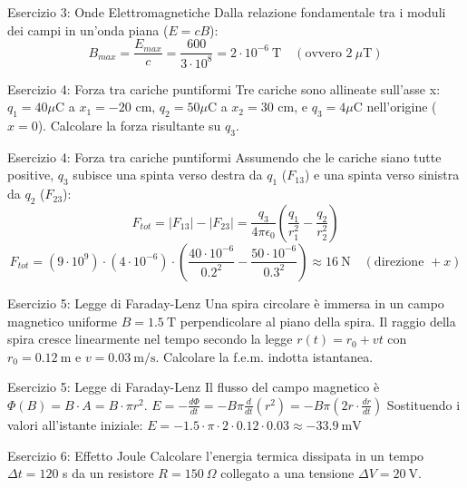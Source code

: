 \documentclass[a4paper]{article}
\begin{document}
\begin{snippetsolution}{Esercizio 3: Onde Elettromagnetiche}
    Dalla relazione fondamentale tra i moduli dei campi in un'onda piana (\(E=cB\)):
    \[
    B_{max} = \frac{E_{max}}{c} = \frac{600}{3\cdot10^{8}} = 2\cdot10^{-6}~\mathrm{T} \quad (\text{ovvero } 2~\mu \mathrm{T})
    \]
\end{snippetsolution}
\begin{snippetexercise}{Esercizio 4: Forza tra cariche puntiformi}
    Tre cariche sono allineate sull'asse x: \(q_{1}=40\mu \mathrm{C}\) a \(x_{1}=-20\) cm, \(q_{2}=50\mu \mathrm{C}\) a \(x_{2}=30\) cm, e \(q_{3}=4\mu \mathrm{C}\) nell'origine (\(x=0\)). Calcolare la forza risultante su \(q_{3}\).
\end{snippetexercise}
\begin{snippetsolution}{Esercizio 4: Forza tra cariche puntiformi}
    Assumendo che le cariche siano tutte positive, \(q_{3}\) subisce una spinta verso destra da \(q_{1}\) (\(F_{13}\)) e una spinta verso sinistra da \(q_{2}\) (\(F_{23}\)):
    \[
    F_{tot} = |F_{13}| - |F_{23}| = \frac{q_{3}}{4\pi\epsilon_{0}}\left(\frac{q_{1}}{r_{1}^{2}} - \frac{q_{2}}{r_{2}^{2}}\right)
    \]
    \[
    F_{tot} = (9\cdot10^{9})\cdot(4\cdot10^{-6})\cdot\left(\frac{40\cdot10^{-6}}{0.2^{2}} - \frac{50\cdot10^{-6}}{0.3^{2}}\right) \approx 16~\mathrm{N} \quad (\text{direzione } +x)
    \]
\end{snippetsolution}
\begin{snippetexercise}{Esercizio 5: Legge di Faraday-Lenz}
    Una spira circolare è immersa in un campo magnetico uniforme \(B=1.5~\mathrm{T}\) perpendicolare al piano della spira. Il raggio della spira cresce linearmente nel tempo secondo la legge \(r(t) = r_{0}+vt\) con \(r_{0}=0.12~\mathrm{m}\) e \(v=0.03~\mathrm{m/s}\). Calcolare la f.e.m. indotta istantanea.
\end{snippetexercise}
\begin{snippetsolution}{Esercizio 5: Legge di Faraday-Lenz}
    Il flusso del campo magnetico è \(\Phi(B) = B \cdot A = B \cdot \pi r^{2}\).
    \(E = -\frac{d\Phi}{dt} = -B\pi\frac{d}{dt}(r^{2}) = -B\pi\left(2r\cdot\frac{dr}{dt}\right)\)
    Sostituendo i valori all'istante iniziale:
    \(E = -1.5 \cdot \pi \cdot 2 \cdot 0.12 \cdot 0.03 \approx -33.9~\mathrm{mV}\)
\end{snippetsolution}
\begin{snippetexercise}{Esercizio 6: Effetto Joule}
    Calcolare l'energia termica dissipata in un tempo \(\Delta t=120\) s da un resistore \(R=150~\Omega\) collegato a una tensione \(\Delta V=20~\mathrm{V}\).
\end{snippetexercise}
\end{document}
